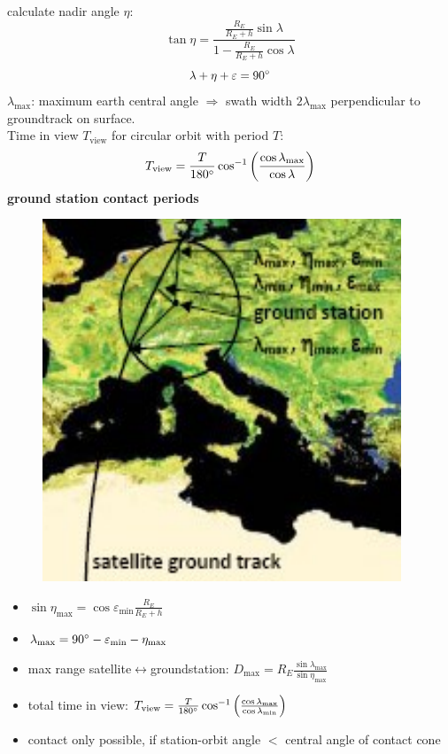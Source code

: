 \documentclass[a4paper,10pt]{article}
\newcommand{\f}{\textbf}
\begin{document}
calculate nadir angle $\eta$:
\[ \tan \eta = \frac{\frac{R_E}{R_E+h}\sin \lambda}{1-\frac{R_E}{R_E+h}\cos\lambda}\]
\[ \lambda + \eta + \varepsilon = 90\degree \]
$\lambda_\text{max}$: maximum earth central angle $\Rightarrow$ swath width $2\lambda_\text{max}$ perpendicular to groundtrack on surface.\\
Time in view $T_\text{view}$ for circular orbit with period $T$:
\[ T_\text{view} = \frac{T}{180\degree}\cos^{-1}\left(\frac{\cos \lambda_\text{max}}{\cos \lambda}\right)\]
\f{ground station contact periods}
\begin{figure}[!ht]
 \centering
 \includegraphics[scale=0.6]{groundtrack}
\end{figure}
\begin{itemize}
 \item $\sin\eta_\text{max} = \cos \varepsilon_\text{min}\frac{R_E}{R_E+h}$
 \item $\lambda_\text{max} = 90\degree - \varepsilon_\text{min} -\eta_\text{max}$
 \item max range satellite$\leftrightarrow$groundstation: $D_\text{max} = R_E\frac{\sin\lambda_\text{max}}{\sin\eta_\text{max}}$
 \item total time in view: $ T_\text{view} = \frac{T}{180\degree}\cos^{-1}\left(\frac{\cos \lambda_\text{max}}{\cos \lambda_\text{min}}\right)$
 \item contact only possible, if station-orbit angle $<$ central angle of contact cone
\end{itemize}
\end{document}

